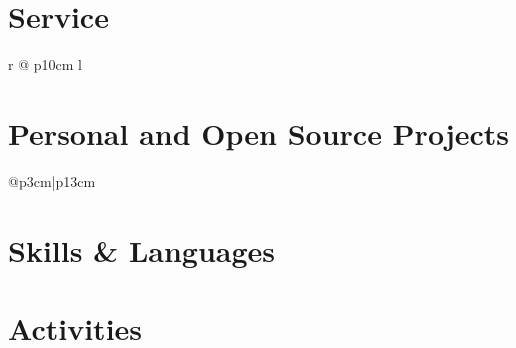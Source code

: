 \documentclass[10pt]{article}
\begin{document}
\section{Service}
\vspace{-1em}
\newcommand{\service}[3]{
  \textsc{#1} & #2 \textcolor{lightg}{\dotfill} & \emph{#3}\\
}
\renewcommand*{\arraystretch}{1.33}
\begin{longtable}{r @{\hspace{0.5em}\textcolor{lightg}{}\hspace{0.5em}} p{10cm} l}
  \servicelist
\end{longtable}

\section{Personal and Open Source Projects}
\newcommand{\proj}[3]{
  \textsc{#1} & #2\\
   &\href{http://www.#3}{#3}\\
   \multicolumn{2}{c}{} \\ [-1.5ex]
}
\begin{longtable}{@{}p{3cm}|p{13cm}}
  \matsciseg
  \ratiocontour
  \digitalcollation
  \matscicut
  \befungepy
\end{longtable}

\begin{minipage}{\linewidth}
  \vspace{-1em}
  \section{Skills \& Languages}
  \begin{multicols}{4}
    \raggedcolumns
    \begin{itemize}
      \renewcommand{\labelitemi}{}
      \renewcommand{\skill}{\textnormal}
      \setlength{\itemsep}{1pt}
      \setlength{\parskip}{0pt}
      \setlength{\parsep}{0pt}
      \skillsListLong
    \end{itemize}
  \end{multicols}
  \skillsLegend
\end{minipage}
\vspace{-1em}

\section{Activities}
\activities

\footer

\end{document}
